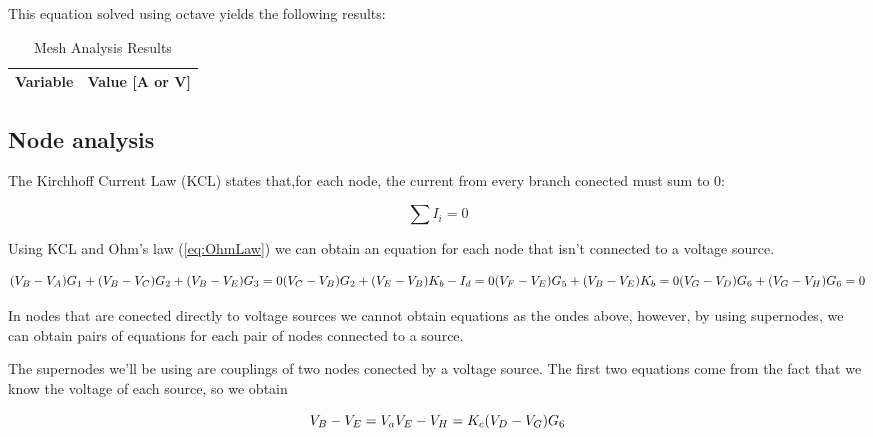This equation solved using octave yields the following results:

\begin{table}[H]
    \centering
    \begin{tabular}{|l|r|}
      \hline    
      {\bf Variable} & {\bf Value [A or V]} \\ \hline
      
    \end{tabular}
    \caption{Mesh Analysis Results}
    \label{tab:meshA}
  \end{table}

\subsection{Node analysis}
The Kirchhoff Current Law (KCL) states that,for each node, the current from every branch conected must sum to 0:

\begin{equation}
  \sum I_i = 0
  \label{eq:KCL}
\end{equation}


Using KCL and Ohm's law (\ref{eq:OhmLaw}) we can obtain an equation for each node that isn't connected to a voltage source.

\begin{equation}
    
  (V_B-V_A)G_1+(V_B-V_C)G_2+(V_B-V_E)G_3=0\\
  
  (V_C-V_B)G_2+(V_E-V_B)K_b-I_d=0\\
  
  (V_F-V_E)G_5+(V_B-V_E)K_b=0\\
  
  (V_G-V_D)G_6+(V_G-V_H)G_6=0

  \label{eq:nodos}
\end{equation}


In nodes that are conected directly to voltage sources we cannot obtain equations as the ondes above, however, by using supernodes, we can obtain pairs of equations for each pair of nodes connected to a source.
\par
The supernodes we'll be using are couplings of two nodes conected by a voltage source. The first two equations come from the fact that we know the voltage of each source, so we obtain

 \begin{equation}
  V_B-V_E=V_a\\
  
  V_E-V_H=K_c(V_D-V_G)G_6
  \label{eq:supenodosV}
\end{equation}

